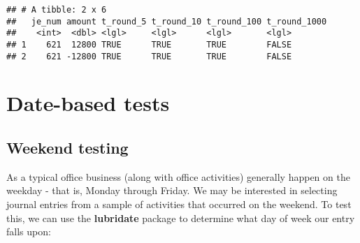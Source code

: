 \documentclass[
]{book}
\newenvironment{Shaded}{\begin{snugshade}}{\end{snugshade}}
\newcommand{\DataTypeTok}[1]{\textcolor[rgb]{0.13,0.29,0.53}{#1}}
\newcommand{\DecValTok}[1]{\textcolor[rgb]{0.00,0.00,0.81}{#1}}
\newcommand{\KeywordTok}[1]{\textcolor[rgb]{0.13,0.29,0.53}{\textbf{#1}}}
\newcommand{\NormalTok}[1]{#1}
\newcommand{\OperatorTok}[1]{\textcolor[rgb]{0.81,0.36,0.00}{\textbf{#1}}}
\newcommand{\StringTok}[1]{\textcolor[rgb]{0.31,0.60,0.02}{#1}}
\begin{document}
\begin{Shaded}
\end{Shaded}

\begin{verbatim}
## # A tibble: 2 x 6
##   je_num amount t_round_5 t_round_10 t_round_100 t_round_1000
##    <int>  <dbl> <lgl>     <lgl>      <lgl>       <lgl>       
## 1    621  12800 TRUE      TRUE       TRUE        FALSE       
## 2    621 -12800 TRUE      TRUE       TRUE        FALSE
\end{verbatim}

\hypertarget{date-based-tests}{%
\section{Date-based tests}\label{date-based-tests}}

\hypertarget{weekend-testing}{%
\subsection{Weekend testing}\label{weekend-testing}}

As a typical office business (along with office activities) generally happen on the weekday - that is, Monday through Friday. We may be interested in selecting journal entries from a sample of activities that occurred on the weekend. To test this, we can use the \textbf{lubridate} package to determine what day of week our entry falls upon:
\end{document}

